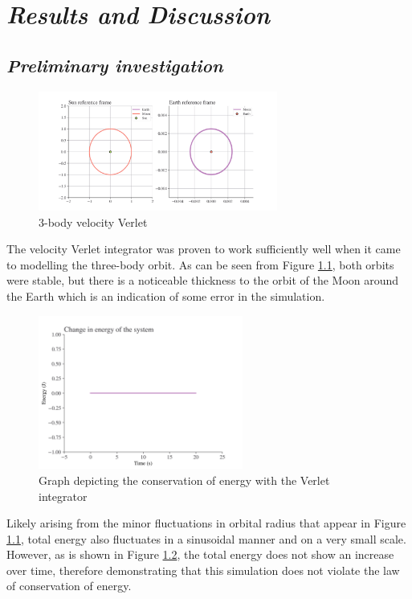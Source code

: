 \documentclass[12pt, english]{report}
\begin{document}
%

\chapter{\textsl{Results and Discussion}}
\section{\textsl{Preliminary investigation}}
\begin{figure}[ht]
    \centering
    \includegraphics[width=0.7\textwidth]{graphics/3b_verlet.png}
    \caption{3-body velocity Verlet}
    \label{fig:3b_verlet}
\end{figure}

\normalsize{\noindent The velocity Verlet integrator was proven to work sufficiently well when it came to modelling the three-body orbit. As can be seen from Figure \ref{fig:3b_verlet}, both orbits were stable, but there is a noticeable thickness to the orbit of the Moon around the Earth which is an indication of some error in the simulation.
\begin{figure}[ht]
    \centering
    \includegraphics[width=0.6\textwidth]{graphics/3b_conservation.png}
    \caption{Graph depicting the conservation of energy with the Verlet integrator}
    \label{fig:3b_conservation}
\end{figure}

Likely arising from the minor fluctuations in orbital radius that appear in Figure \ref{fig:3b_verlet}, total energy also fluctuates in a sinusoidal manner and on a very small scale. However, as is shown in Figure \ref{fig:3b_conservation}, the total energy does not show an increase over time, therefore demonstrating that this simulation does not violate the law of conservation of energy.}
\end{document}
